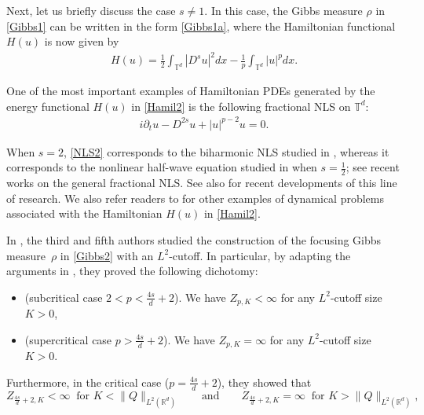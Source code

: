 \documentclass[letterpaper, 11pt,  reqno]{amsart}
\newcommand{\noi}{\noindent}
\newcommand{\R}{\mathbb{R}}
\newcommand{\T}{\mathbb{T}}
\numberwithin{equation}{section}
\numberwithin{theorem}{section}
\begin{document}
Next, let us briefly discuss the 
case $s \ne 1$.
In this case, the Gibbs measure $\rho$ in \eqref{Gibbs1}
can be written in the form
 \eqref{Gibbs1a}, 
where  the Hamiltonian functional $H(u)$ is now given by 
\begin{align}
H(u) = \frac 12 \int_{\T^d} |D^s u|^2 dx - \frac 1p \int_{\T^d} |u|^p dx.
\label{Hamil2}
\end{align}


\noi
One of the most 
important examples of Hamiltonian PDEs generated by the energy functional 
$H(u)$ in \eqref{Hamil2} 
is the following fractional NLS on $\T^d$:
\begin{align}
i\partial_t u - D^{2s} u  + |u|^{p-2 }u = 0.
\label{NLS2}
\end{align}





\noi
When $s = 2$, \eqref{NLS2}
corresponds to the biharmonic NLS
studied in  \cite{OTz, OSTz, OTW}, 
whereas it corresponds to the 
nonlinear half-wave equation
studied in \cite{Poco} 
when $s=\frac12$;
see recent works \cite{ST20,ST21,LW23, FT}
on  the general fractional NLS.
See also \cite{FO23, DNY3, CLL} for  recent developments of this line of research.
We also refer readers to 
\cite[Subsection 1.2]{OST}
for other examples of  dynamical problems
associated with the Hamiltonian $H(u)$ in \eqref{Hamil2}.



In \cite{LW22}, 
the third and fifth authors studied 
the construction of the focusing Gibbs measure~$\rho$ in \eqref{Gibbs2}
 with an $L^2$-cutoff.
In particular, by adapting the arguments in \cite{LRS, OST1}, 
they   proved 
the following dichotomy:
\smallskip 

\begin{itemize}
\item[(i)] 
(subcritical case $2 < p < \frac{4s}{d} + 2$).
We have 
 $Z_{p, K} < \infty $  for any $L^2$-cutoff size $K > 0$, 


\smallskip

\item[(ii)] 
(supercritical case $p > \frac{4s}{d} + 2$).
We have  $Z_{p, K} = \infty$  for any $L^2$-cutoff size $K > 0$.


\end{itemize}

\smallskip

\noi
Furthermore, in the 
critical case ($p = \frac{4s}{d} + 2$), they showed that  
\[
Z_{\frac{4s}{d} + 2, K}<\infty \ \text{ for } K<\|Q\|_{L^2(\R^d)}
\qquad
\text{and}
\qquad
Z_{\frac{4s}{d} + 2, K}=\infty \ \text{ for } K>\|Q\|_{L^2(\R^d)}, 
\]
\end{document}
